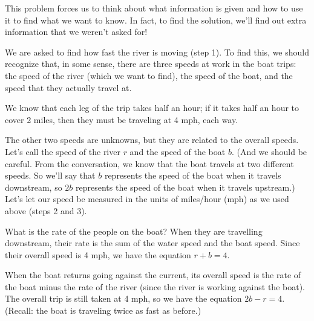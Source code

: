 {This problem forces us to think about what information is given and how to use it to find what we want to know. In fact, to find the solution, we'll find out extra information that we weren't asked for!


We are asked to find how fast the river is moving (step 1). To find this, we should recognize that, in some sense, there are three speeds at work in the boat trips: the speed of the river (which we want to find), the speed of the boat, and the speed that they actually travel at.

We know that each leg of the trip takes half an hour; if it takes half an hour to cover 2 miles, then they must be traveling at 4 mph, each way.

The other two speeds are unknowns, but they are related to the overall speeds. Let's call the speed of the river $r$ and the speed of the boat $b$. (And we should be careful. From the conversation, we know that the boat travels at two different speeds. So we'll say that $b$ represents the speed of the boat when it travels downstream, so $2b$ represents the speed of the boat when it travels upstream.) Let's let our speed be measured in the units of miles/hour (mph) as we used above (steps 2 and 3).


What is the rate of the people on the boat? When they are travelling downstream, their rate is the sum of the water speed and the boat speed. Since their overall speed is 4 mph, we have the equation $r+b=4$. 

When the boat returns going against the current, its overall speed is the rate of the boat minus the rate of the river (since the river is working against the boat). The overall trip is still taken at 4 mph, so we have the equation $2b-r=4$. (Recall: the boat is traveling twice as fast as before.)


}
